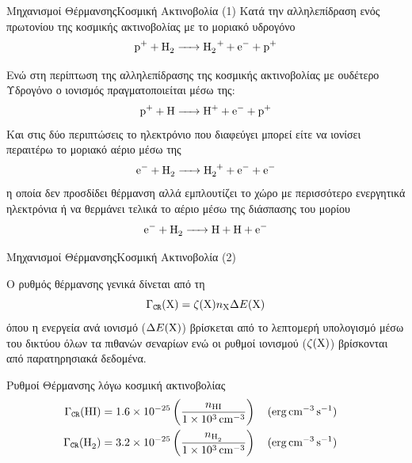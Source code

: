\documentclass{beamer}
\begin{document}
\begin{frame}{Μηχανισμοί Θέρμανσης}{Κοσμική Ακτινοβολία (1)}
Κατά την αλληλεπίδραση ενός πρωτονίου της κοσμικής ακτινοβολίας με το μοριακό υδρογόνο
\begin{equation}
\ce{p^+ +H2 -> H2 ^+ +e^- +p^+}
\end{equation}

Ενώ στη περίπτωση της αλληλεπίδρασης της κοσμικής ακτινοβολίας με ουδέτερο Υδρογόνο ο ιονισμός πραγματοποιείται μέσω της:
\begin{equation}
\ce{p^+ + H -> H^+ + e^- + p^+}
\end{equation}
Και στις δύο περιπτώσεις το ηλεκτρόνιο που διαφεύγει μπορεί είτε να ιονίσει περαιτέρω το μοριακό αέριο μέσω της
\begin{equation}
\ce{e^- + H2 -> H2^+ + e^- + e^-}
\end{equation}
η οποία δεν προσδίδει θέρμανση αλλά εμπλουτίζει το χώρο με περισσότερο ενεργητικά ηλεκτρόνια ή να θερμάνει τελικά το αέριο μέσω της διάσπασης του μορίου
\begin{equation}
\ce{e^- + H2 -> H + H + e^-}
\end{equation} 


\end{frame}


\begin{frame}{Μηχανισμοί Θέρμανσης}{Κοσμική Ακτινοβολία (2)}

Ο ρυθμός θέρμανσης γενικά δίνεται από τη
\begin{equation}
\Gamma _\mathtt{CR} (\ce{X}) =\zeta (\ce{X})n_{\ce{X}} \Delta E (\ce{X})
\end{equation}
όπου η ενεργεία ανά ιονισμό ($\Delta E (\ce{X})$) βρίσκεται από το λεπτομερή υπολογισμό μέσω του δικτύου όλων τα πιθανών σεναρίων ενώ οι ρυθμοί ιονισμού ($\zeta (\ce{X})$) βρίσκονται από παρατηρησιακά δεδομένα.
\begin{block}{Ρυθμοί Θέρμανσης λόγω κοσμική ακτινοβολίας}
 \begin{align}
\Gamma _\mathtt{CR} (\ce{HI}) &= \num{1.6e-25} \left( \frac{n_{\ce{HI}}}{\SI{1e3}{cm^{-3}}} \right) \qq{(\si{erg.cm^{-3}.s^{-1}})} \\
\Gamma _\mathtt{CR} (\ce{H2}) &= \num{3.2e-25} \left( \frac{n_{\ce{H2}}}{\SI{1e3}{cm^{-3}}} \right) \qq{(\si{erg.cm^{-3}.s^{-1}})} 
\end{align}
\end{block}

\end{frame}
\end{document}
